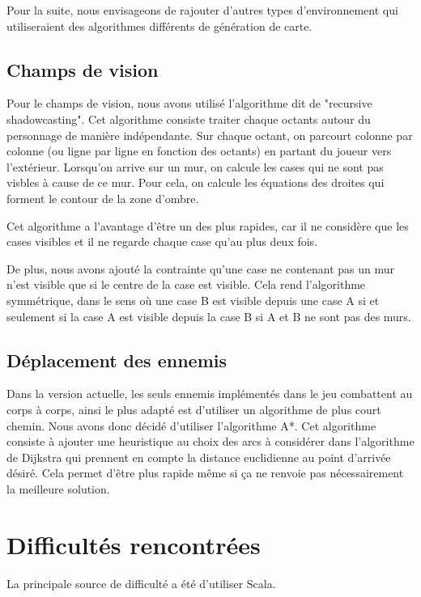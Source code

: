 \documentclass[10pt,a4paper]{article}
\begin{document}
Pour la suite, nous envisageons de rajouter d'autres types d'environnement qui utiliseraient des algorithmes différents de génération de carte.

\subsection{Champs de vision}

Pour le champs de vision, nous avons utilisé l'algorithme dit de "recursive shadowcasting". Cet algorithme consiste traiter chaque octants autour du personnage de manière indépendante. Sur chaque octant, on parcourt colonne par colonne (ou ligne par ligne en fonction des octants) en partant du joueur vers l'extérieur. Lorsqu'on arrive sur un mur, on calcule les cases qui ne sont pas visbles à cause de ce mur. Pour cela, on calcule les équations des droites qui forment le contour de la zone d'ombre.

Cet algorithme a l'avantage d'être un des plus rapides, car il ne considère que les cases visibles et il ne regarde chaque case qu'au plus deux fois.

De plus, nous avons ajouté la contrainte qu'une case ne contenant pas un mur n'est visible que si le centre de la case est visible. Cela rend l'algorithme symmétrique, dans le sens où une case B est visible depuis une case A si et seulement si la case A est visible depuis la case B si A et B ne sont pas des murs.

\subsection{Déplacement des ennemis}

Dans la version actuelle, les seuls ennemis implémentés dans le jeu combattent au corps à corps, ainsi le plus adapté est d'utiliser un algorithme de plus court chemin. Nous avons donc décidé d'utiliser l'algorithme A*. Cet algorithme consiste à ajouter une heuristique au choix des arcs à considérer dans l'algorithme de Dijkstra qui prennent en compte la distance euclidienne au point d'arrivée désiré. Cela permet d'être plus rapide même si ça ne renvoie pas nécessairement la meilleure solution.

\section{Difficultés rencontrées}

La principale source de difficulté a été d'utiliser Scala.
\end{document}
